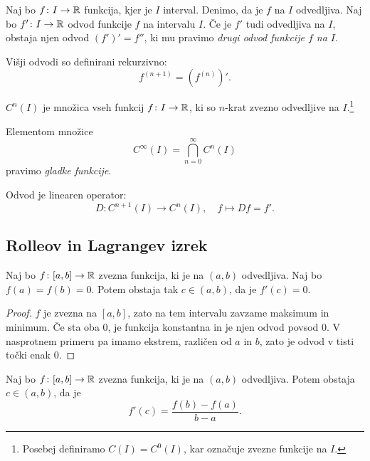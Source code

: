\documentclass[12pt, a4paper]{article}
\begin{document}
\begin{okvir}
\begin{definicija}
Naj bo $f\colon I\to\mathbb{R}$ funkcija, kjer je $I$ interval. Denimo, da je $f$ na $I$ odvedljiva. Naj bo $f'\colon I\to\mathbb{R}$ odvod funkcije $f$ na intervalu $I$. Če je $f'$ tudi odvedljiva na $I$, obstaja njen odvod $(f')'=f''$, ki mu pravimo \emph{drugi odvod funkcije $f$ na $I$}.

Višji odvodi so definirani rekurzivno:
\[
f^{(n+1)}=\left(f^{(n)}\right)'.
\]
\end{definicija}
\end{okvir}

\begin{definicija}
$C^n(I)$ je množica vseh funkcij $f\colon I\to\mathbb{R}$, ki so $n$-krat zvezno odvedljive na $I$.\footnote{Posebej definiramo $C(I)=C^0(I)$, kar označuje zvezne funkcije na $I$.}
\end{definicija}

\begin{definicija}
Elementom množice
\[
C^{\infty}(I)=\bigcap_{n=0}^{\infty}C^n(I)
\]
pravimo \emph{gladke funkcije}.
\end{definicija}

Odvod je linearen operator:
\[
D\colon C^{n+1}(I)\to C^n(I),\quad f\mapsto Df=f'.
\]

\newpage

\subsection{Rolleov in Lagrangev izrek}

\begin{izrek}[Rolle]
Naj bo $f\colon[a,b]\to\mathbb{R}$ zvezna funkcija, ki je na $(a,b)$ odvedljiva. Naj bo $f(a)=f(b)=0$. Potem obstaja tak $c\in(a,b)$, da je $f'(c)=0$.
\end{izrek}

\begin{proof}
$f$ je zvezna na $[a,b]$, zato na tem intervalu zavzame maksimum in minimum. Če sta oba $0$, je funkcija konstantna in je njen odvod povsod $0$. V nasprotnem primeru pa imamo ekstrem, različen od $a$ in $b$, zato je odvod v tisti točki enak $0$.
\end{proof}

\begin{izrek}[Lagrange]
Naj bo $f\colon[a,b]\to\mathbb{R}$ zvezna funkcija, ki je na $(a,b)$ odvedljiva. Potem obstaja $c\in(a,b)$, da je
\[
f'(c)=\frac{f(b)-f(a)}{b-a}.
\]
\end{izrek}
\end{document}
